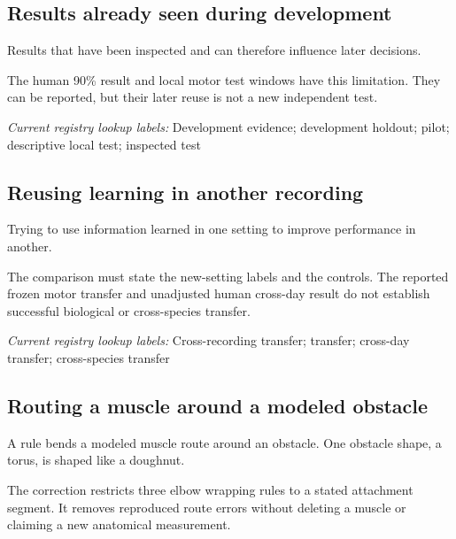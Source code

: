 \begin{samepage}
\subsection*{Results already seen during development}
\noindent Results that have been inspected and can therefore influence later decisions.\par
\end{samepage}
\begin{samepage}
\noindent The human 90\% result and local motor test windows have this limitation. They can be reported, but their later reuse is not a new independent test.\par\nopagebreak[4]

\end{samepage}


\noindent\textit{Current registry lookup labels:} Development evidence; development holdout; pilot; descriptive local test; inspected test\par

\begin{samepage}
\subsection*{Reusing learning in another recording}
\noindent Trying to use information learned in one setting to improve performance in another.\par
\end{samepage}
\begin{samepage}
\noindent The comparison must state the new-setting labels and the controls. The reported frozen motor transfer and unadjusted human cross-day result do not establish successful biological or cross-species transfer.\par\nopagebreak[4]

\end{samepage}


\noindent\textit{Current registry lookup labels:} Cross-recording transfer; transfer; cross-day transfer; cross-species transfer\par

\begin{samepage}
\subsection*{Routing a muscle around a modeled obstacle}
\noindent A rule bends a modeled muscle route around an obstacle. One obstacle shape, a torus, is shaped like a doughnut.\par
\end{samepage}
\begin{samepage}
\noindent The correction restricts three elbow wrapping rules to a stated attachment segment. It removes reproduced route errors without deleting a muscle or claiming a new anatomical measurement.\par\nopagebreak[4]

\end{samepage}


